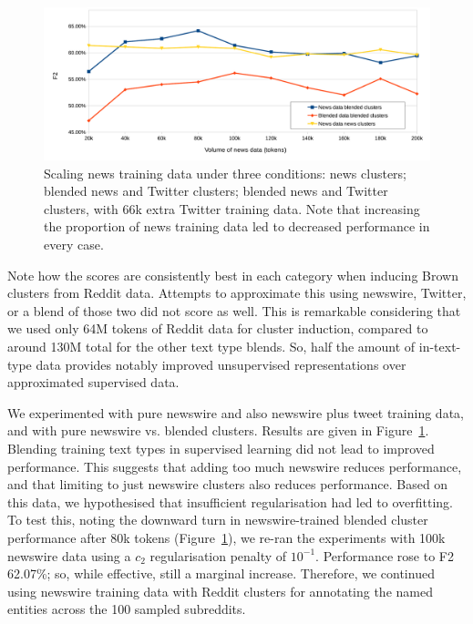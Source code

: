 \documentclass[sigconf]{acmart}
\begin{document}
\begin{figure}
\centering
\includegraphics[width=\columnwidth]{entity-chunking/chart-results-rcv-crop.pdf}
\caption{Scaling news training data under three conditions: news clusters; blended news and Twitter clusters; blended news and Twitter clusters, with 66k extra Twitter training data. Note that increasing the proportion of news training data led to decreased performance in every case.}
\label{fig:rcv-scaling}
\end{figure}

Note how the scores are consistently best in each category when inducing Brown clusters from Reddit data.
Attempts to approximate this using newswire, Twitter, or a blend of those two did not score as well.
This is remarkable considering that we used only 64M tokens of Reddit data for cluster induction, compared to around 130M total for the other text type blends.
So, half the amount of in-text-type data provides notably improved unsupervised representations over approximated supervised data.

We experimented with pure newswire and also newswire plus tweet training data, and with pure newswire vs. blended clusters.
Results are given in Figure~\ref{fig:rcv-scaling}.
Blending training text types in supervised learning did not lead to improved performance.
This suggests that adding too much newswire reduces performance, and that limiting to just newswire clusters also reduces performance.
Based on this data, we hypothesised that insufficient regularisation had led to overfitting.
To test this, noting the downward turn in newswire-trained blended cluster performance after 80k tokens (Figure~\ref{fig:rcv-scaling}), we re-ran the experiments with 100k newswire data using a $c_2$ regularisation penalty of $10^{-1}$. %
Performance rose to F2 62.07\%; so, while effective, still a marginal increase.
Therefore, we continued using newswire training data with Reddit clusters for annotating the named entities across the 100 sampled subreddits.%
\end{document}
